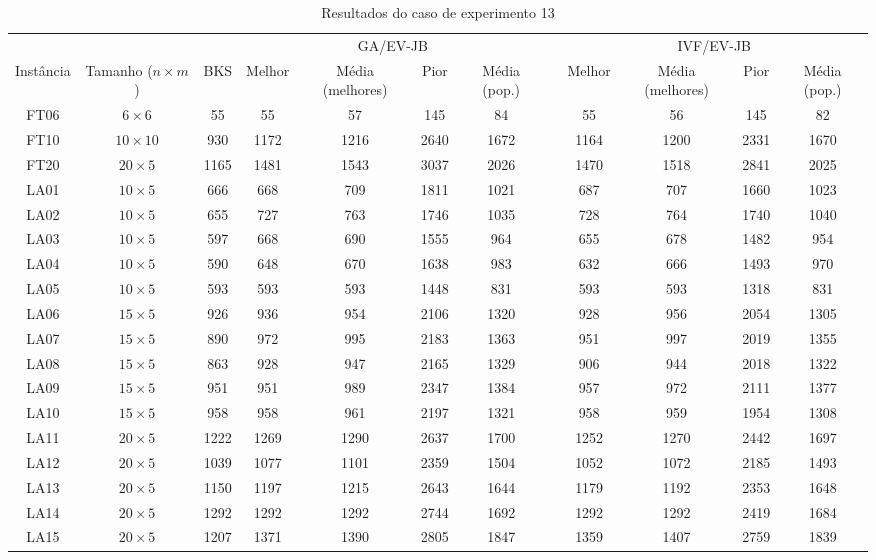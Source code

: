 \begin{sidewaystable}
\caption{Resultados do caso de experimento 13}
\centering
\label{experimento13}
\begin{tabular}{cccccccccccc}
\toprule
& & & \multicolumn{4}{c}{GA/EV-JB} & & \multicolumn{4}{c}{IVF/EV-JB} \\
\cmidrule(c){4-7}
\cmidrule(c){9-12}
Inst\^{a}ncia & Tamanho ($n \times m$) & BKS & Melhor & M\'{e}dia (melhores) & Pior & M\'{e}dia (pop.) & & Melhor & M\'{e}dia (melhores) & Pior & M\'{e}dia (pop.) \\
\midrule
FT06 & $6 \times 6$ & 55 & 55 & 57 & 145 & 84 & & 55 & 56 & 145 & 82 \\
FT10 & $10 \times 10$ & 930 & 1172 & 1216 & 2640 & 1672 & & 1164 & 1200 & 2331 & 1670 \\
FT20 & $20 \times 5$ & 1165 & 1481 & 1543 & 3037 & 2026 & & 1470 & 1518 & 2841 & 2025 \\
LA01 & $10 \times 5$ & 666 & 668 & 709 & 1811 & 1021 & & 687 & 707 & 1660 & 1023 \\
LA02 & $10 \times 5$ & 655 & 727 & 763 & 1746 & 1035 & & 728 & 764 & 1740 & 1040 \\
LA03 & $10 \times 5$ & 597 & 668 & 690 & 1555 & 964 & & 655 & 678 & 1482 & 954 \\
LA04 & $10 \times 5$ & 590 & 648 & 670 & 1638 & 983 & & 632 & 666 & 1493 & 970 \\
LA05 & $10 \times 5$ & 593 & 593 & 593 & 1448 & 831 & & 593 & 593 & 1318 & 831 \\
LA06 & $15 \times 5$ & 926 & 936 & 954 & 2106 & 1320 & & 928 & 956 & 2054 & 1305 \\
LA07 & $15 \times 5$ & 890 & 972 & 995 & 2183 & 1363 & & 951 & 997 & 2019 & 1355 \\
LA08 & $15 \times 5$ & 863 & 928 & 947 & 2165 & 1329 & & 906 & 944 & 2018 & 1322 \\
LA09 & $15 \times 5$ & 951 & 951 & 989 & 2347 & 1384 & & 957 & 972 & 2111 & 1377 \\
LA10 & $15 \times 5$ & 958 & 958 & 961 & 2197 & 1321 & & 958 & 959 & 1954 & 1308 \\
LA11 & $20 \times 5$ & 1222 & 1269 & 1290 & 2637 & 1700 & & 1252 & 1270 & 2442 & 1697 \\
LA12 & $20 \times 5$ & 1039 & 1077 & 1101 & 2359 & 1504 & & 1052 & 1072 & 2185 & 1493 \\
LA13 & $20 \times 5$ & 1150 & 1197 & 1215 & 2643 & 1644 & & 1179 & 1192 & 2353 & 1648 \\
LA14 & $20 \times 5$ & 1292 & 1292 & 1292 & 2744 & 1692 & & 1292 & 1292 & 2419 & 1684 \\
LA15 & $20 \times 5$ & 1207 & 1371 & 1390 & 2805 & 1847 & & 1359 & 1407 & 2759 & 1839 \\
\bottomrule
\end{tabular}
\end{sidewaystable}
